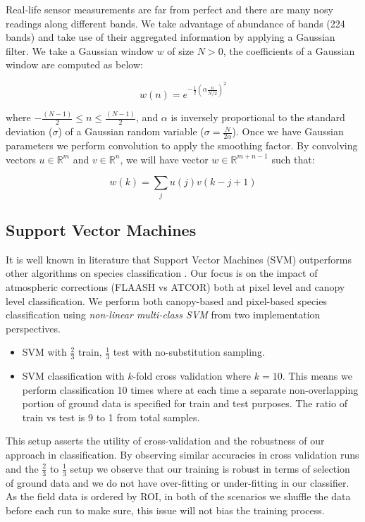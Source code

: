 \documentclass[remotesensing,article,accept,moreauthors,pdftex,12pt,a4paper]{mdpi}
\begin{document}
Real-life sensor measurements are far from perfect and there are many nosy readings along different bands. 
We take advantage of abundance of bands (224 bands) and take use of their aggregated information by applying a Gaussian filter. 
We take a Gaussian window $w$ of size $N > 0$, the coefficients of a Gaussian window are computed as below:

\begin{equation}
w(n) = e^{-\frac{1}{2}(\alpha \frac{n}{N/2})^2}
\end{equation}  

where $-\frac{(N-1)}{2} \leq n \leq \frac{(N-1)}{2}$, and $\alpha$ is inversely proportional to the standard deviation ($\sigma$) of a Gaussian random variable ($\sigma = \frac{N}{2\alpha}$). 
Once we have Gaussian parameters we perform convolution to apply the smoothing factor. 
By convolving vectors $u \in \mathbb{R}^m$ and $v\in \mathbb{R}^n$, we will have vector $w\in \mathbb{R}^{m+n-1}$ such that: 

\begin{equation}
w(k)=\sum_j u(j)v(k-j+1)
\end{equation} 


\subsection{Support Vector Machines}

It is well known in literature that Support Vector Machines (SVM) outperforms other algorithms on species classification \cite{colgan2012mapping, baldeck2014landscape, cho2012mapping}. 
Our focus is on the impact of atmospheric corrections (FLAASH vs ATCOR) both at pixel level and canopy level classification.
We perform both canopy-based and pixel-based species classification using \textit{non-linear multi-class SVM} from two implementation perspectives. 


\begin{itemize}
\item SVM with $\frac{2}{3}$ train, $\frac{1}{3}$ test with no-substitution sampling.
\item SVM classification with $k$-fold cross validation where $k=10$. 
This means we perform classification 10 times where at each time a separate non-overlapping portion of ground data is specified for train and test purposes. 
The ratio of train vs test is 9 to 1 from total samples.
\end{itemize}


This setup asserts the utility of cross-validation and the robustness of our approach in classification. 
By observing similar accuracies in cross validation runs and the $\frac{2}{3}$ to $\frac{1}{3}$ setup we observe that our training is robust in terms of selection of ground data and we do not have over-fitting or under-fitting in our classifier. 
As the field data is ordered by ROI, in both of the scenarios we shuffle the data before each run to make sure, this issue will not bias the training process.
\end{document}
